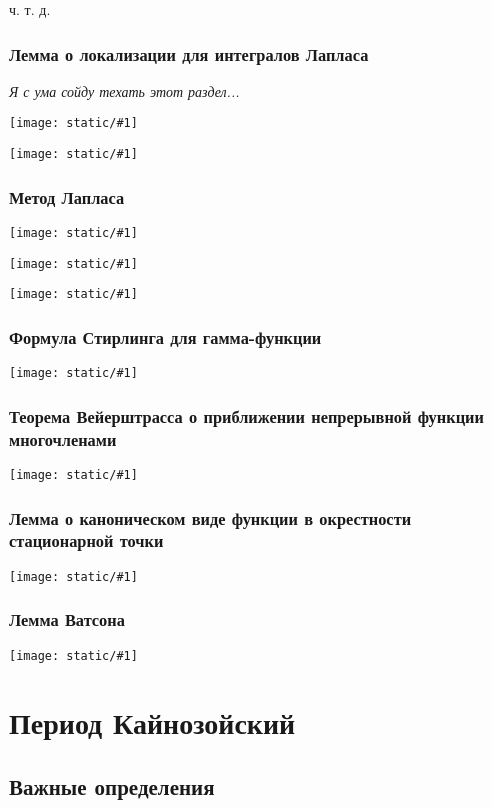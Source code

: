 \documentclass{article}
\def\imageh#1{\texttt{[image: static/\#1]}}
\begin{document}
ч. т. д. 


\subsubsection{Лемма о локализации для интегралов Лапласа}

\textit{Я с ума сойду техать этот раздел...}

\imageh{loc_lapl_1.jpg}

\imageh{loc_lapl_2.jpg}

\subsubsection{Метод Лапласа}

\imageh{met_lapl_1.jpg}

\imageh{met_lapl_2.jpg}

\imageh{met_lapl_3.jpg}

\subsubsection{Формула Стирлинга для гамма-функции}

\imageh{stirl_gamm.jpg}

\subsubsection{Теорема Вейерштрасса о приближении непрерывной функции многочленами}

\imageh{veiersht_lap.jpg}

\subsubsection{Лемма о каноническом виде функции в окрестности стационарной точки}

\imageh{kanon_vd.jpg}

\subsubsection{Лемма Ватсона}

\imageh{watson_l.jpg}

\newpage

\section{Период Кайнозойский}
\subsection{Важные определения}
\end{document}
